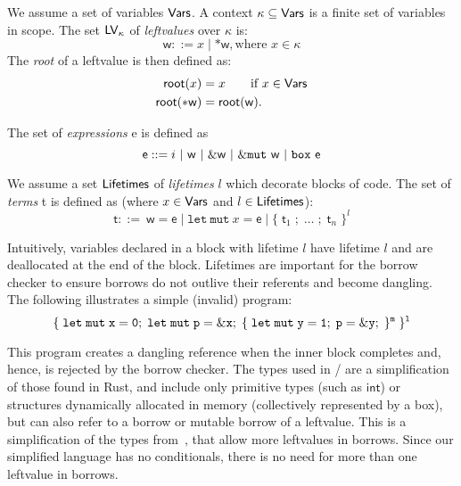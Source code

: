 \begin{definition}[LVals]
  We assume a set of variables $\mathsf{Vars}$.  A context
  $\kappa\subseteq\mathsf{Vars}$ is a finite set of variables in scope.  The
  set $\mathsf{LV}_\kappa$ of \emph{leftvalues} over $\kappa$ is:
  \begin{displaymath}
    \mathsf{w} ::= x\;|\;\mathtt{*}\mathsf{w}, \text{where $x\in\kappa$}
  \end{displaymath}
  The \emph{root} of a leftvalue is then defined as:
  \begin{align*}
    \mathsf{root}(x) &= x\qquad\text{if $x\in\mathsf{Vars}$}\\
    \mathsf{root}(\mathtt{*}\mathsf{w}) &= \mathsf{root}(\mathsf{w}).
  \end{align*}
\end{definition}
\begin{definition}[Expressions]
  The set of \emph{expressions} \textsf{e} is defined as
  \begin{displaymath}
    \mathsf{e} ::= i\ |\ \mathsf{w}\ |\ \borrow\mathsf{w}\ |\ \mutborrow\mathsf{w}\ |\ \mathtt{box}\ \mathsf{e}
  \end{displaymath}
\end{definition}  
\begin{definition}[Terms]  
  We assume a set $\mathsf{Lifetimes}$ of \emph{lifetimes} $l$ which decorate
  blocks of code.  The set of \emph{terms} \textsf{t} is defined as (where $x\in\mathsf{Vars}$ and $l\in\mathsf{Lifetimes}$):
  \begin{displaymath}
    \mathsf{t} ::= \ \mathsf{w}=\mathsf{e}\;|\;\mathtt{let\ mut}\ x=\mathsf{e}\;|\;\{\;\mathsf{t}_1\;;\;\ldots\;;\;\mathsf{t}_n\;\}^l
  \end{displaymath}
\end{definition}
%
Intuitively, variables declared in a block with lifetime $l$ have
lifetime $l$ and are deallocated at the end of the block.  Lifetimes
are important for the borrow checker to ensure borrows do not outlive
their referents and become dangling.  The following illustrates a
simple (invalid) program:
\begin{displaymath}
{\tt \{\;let\;mut\;x=0;\;let\;mut\;p=\&x;\;\{\;let\;mut\;y=1;\;p=\&y;\;\}^m\;\}^l}
\end{displaymath}

This program creates a dangling reference when the inner block
completes and, hence, is rejected by the borrow checker.  The types
used in \FR/ are a simplification of those found in Rust, and include
only primitive types (such as $\mathsf{int}$) or structures
dynamically allocated in memory (collectively represented by a box),
but can also refer to a borrow or mutable borrow of a leftvalue.  This
is a simplification of the types from~\cite{Pea21}, that allow more
leftvalues in borrows. Since our simplified language has no
conditionals, there is no need for more than one leftvalue in borrows.

